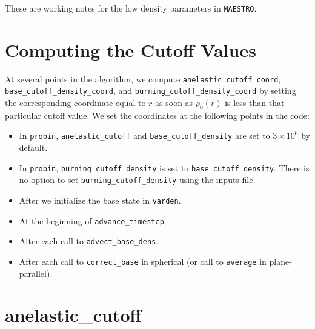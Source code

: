 These are working notes for the low density parameters in {\tt MAESTRO}.

\section{Computing the Cutoff Values}

At several points in the algorithm, we compute {\tt anelastic\_cutoff\_coord}, 
{\tt base\_cutoff\_density\_coord}, and {\tt burning\_cutoff\_density\_coord} by 
setting the corresponding coordinate equal to $r$ as soon as $\rho_0(r)$ is less than 
that particular cutoff value.  We set the coordinates at the following points in the
code:

\begin{itemize}

\item In {\tt probin}, {\tt anelastic\_cutoff} and {\tt base\_cutoff\_density} are
  set to $3\times 10^6$ by default.

\item In {\tt probin}, {\tt burning\_cutoff\_density} is set to 
  {\tt base\_cutoff\_density}.  There is no option to set 
  {\tt burning\_cutoff\_density} using the inputs file.

\item After we initialize the base state in {\tt varden}.

\item At the beginning of {\tt advance\_timestep}.

\item After each call to {\tt advect\_base\_dens}.

\item After each call to {\tt correct\_base} in spherical 
  (or call to {\tt average} in plane-parallel).

\end{itemize}

\section{anelastic\_cutoff}

